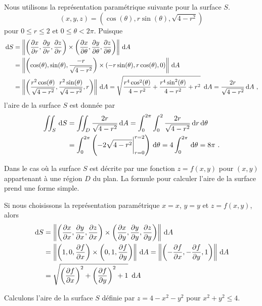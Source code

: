 {\begin{egg}
Nous utilisons la représentation paramétrique suivante pour la surface $S$.
\[
  (x,y,z) = (\cos(\theta), r\sin(\theta), \sqrt{4 - r^2})
\]
pour $0 \leq r \leq 2$ et $0 \leq \theta < 2\pi$.  Puisque
\begin{align*}
\,\mathrm{d}S &= \left\| \left( \frac{\partial x}{\partial r} , \frac{\partial y}{\partial r} , \frac{\partial z}{\partial r} \right)
\times
\left( \frac{\partial x}{\partial \theta} , \frac{\partial y}{\partial \theta} , \frac{\partial z}{\partial \theta} \right) 
\right\| \,\mathrm{d}A\\
&= \left\| \left(\cos(\theta) , \sin(\theta) , \frac{-r}{\sqrt{4-r^2}} \right)
\times
\left( -r\sin(\theta) , r \cos(\theta) , 0 \right) \right\| \,\mathrm{d}A\\
&= \left\| \left( \frac{r^2 \cos(\theta)}{\sqrt{4 - r^2}} ,
\frac{r^2 \sin(\theta)}{\sqrt{4 - r^2}} , r \right) \right\| \,\mathrm{d}A
= \sqrt{ \frac{r^4 \cos^2(\theta)}{4 - r^2} +
\frac{r^4 \sin^2(\theta)}{4 - r^2} + r^2}\ \,\mathrm{d}A
= \frac{2r}{\sqrt{4 - r^2}} \,\mathrm{d}A \ ,
\end{align*}
l'aire de la surface $S$ est donnée par
\begin{align*}
\iint_S \,\mathrm{d}S &= \iint_D \frac{2r}{\sqrt{4 - r^2}} \,\mathrm{d}A
= \int_0^{2\pi} \int_0^2 \frac{2r}{\sqrt{4 - r^2}} \,\mathrm{d}r \,\mathrm{d}\theta \\
&= \int_0^{2\pi} \left( -2\sqrt{4 - r^2}\bigg|_{r=0}^{r=2}\right) \,\mathrm{d}\theta
= 4 \int_0^{2\pi} \,\mathrm{d}\theta = 8 \pi \ .
\end{align*}
\end{egg}

Dans le cas où la surface $S$ est décrite par une fonction $z = f(x,y)$
pour $(x,y)$ appartenant à une région $D$ du plan.  La formule pour
calculer l'aire de la surface prend une forme simple.

Si nous choisissons la représentation paramétrique $x = x$, $y = y$ et
$z = f(x,y)$, alors
\begin{align*}
\,\mathrm{d}S &= \left\| \left( \frac{\partial x}{\partial x} , \frac{\partial y}{\partial x} , \frac{\partial z}{\partial x} \right)
\times
\left( \frac{\partial x}{\partial y} , \frac{\partial y}{\partial y} , \frac{\partial z}{\partial y} \right) 
\right\| \,\mathrm{d}A\\
&= \left\| \left(1, 0, \frac{\partial f}{\partial x} \right)
\times
\left( 0, 1, \frac{\partial f}{\partial y} \right) \right\| \,\mathrm{d}A
= \left\| \left( -\frac{\partial f}{\partial x}, -\frac{\partial f}{\partial y}, 1 \right) \right\| \,\mathrm{d}A\\
&= \sqrt{ \left(\frac{\partial f}{\partial x}\right)^2 + \left(\frac{\partial f}{\partial y}\right)^2
+ 1}\ \,\mathrm{d}A
\end{align*}

\begin{egg}
Calculons l'aire de la surface $S$ définie par $z = 4 - x^2 - y^2$ pour
$x^2 + y^2 \leq 4$.


\end{egg}}
